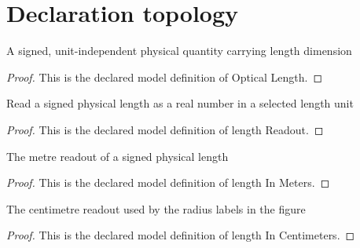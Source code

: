 \section{Declaration topology}
\begin{definition}
  \label{def:physics:phyx-mini-0133:phyxminiproblems-problemphyxmini0133-opticallength}
  A signed, unit-independent physical quantity carrying length dimension
\end{definition}
\begin{proof}
  This is the declared model definition of Optical Length.
\end{proof}
\begin{definition}
  \label{def:physics:phyx-mini-0133:phyxminiproblems-problemphyxmini0133-lengthreadout}
  Read a signed physical length as a real number in a selected length unit
\end{definition}
\begin{proof}
  This is the declared model definition of length Readout.
\end{proof}
\begin{definition}
  \label{def:physics:phyx-mini-0133:phyxminiproblems-problemphyxmini0133-lengthinmeters}
  The metre readout of a signed physical length
\end{definition}
\begin{proof}
  This is the declared model definition of length In Meters.
\end{proof}
\begin{definition}
  \label{def:physics:phyx-mini-0133:phyxminiproblems-problemphyxmini0133-lengthincentimeters}
  The centimetre readout used by the radius labels in the figure
\end{definition}
\begin{proof}
  This is the declared model definition of length In Centimeters.
\end{proof}
